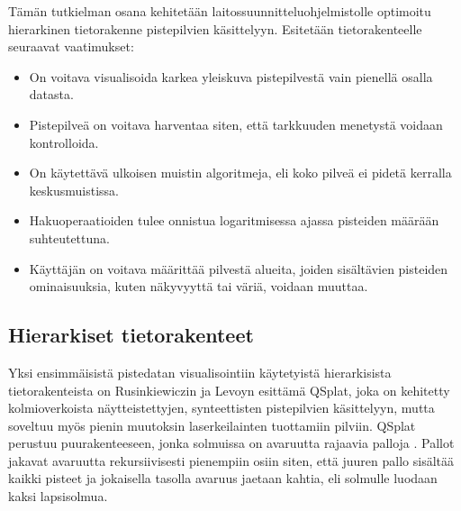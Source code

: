 Tämän tutkielman osana kehitetään laitossuunnitteluohjelmistolle optimoitu hierarkinen tietorakenne pistepilvien käsittelyyn. Esitetään tietorakenteelle seuraavat vaatimukset:
\begin{itemize}
    \item On voitava visualisoida karkea yleiskuva pistepilvestä vain pienellä osalla datasta. 
    \item Pistepilveä on voitava harventaa siten, että tarkkuuden menetystä voidaan kontrolloida.
    \item On käytettävä ulkoisen muistin algoritmeja, eli koko pilveä ei pidetä kerralla keskusmuistissa.
    \item Hakuoperaatioiden tulee onnistua logaritmisessa ajassa pisteiden määrään suhteutettuna.
    \item Käyttäjän on voitava määrittää pilvestä alueita, joiden sisältävien pisteiden ominaisuuksia, kuten näkyvyyttä tai väriä, voidaan muuttaa.
\end{itemize}

\subsection{Hierarkiset tietorakenteet}

Yksi ensimmäisistä pistedatan visualisointiin käytetyistä hierarkisista tietorakenteista on Rusinkiewiczin ja Levoyn esittämä QSplat, joka on kehitetty kolmioverkoista näytteistettyjen, synteettisten pistepilvien käsittelyyn, mutta soveltuu myös pienin muutoksin laserkeilainten tuottamiin pilviin. QSplat perustuu puurakenteeseen, jonka solmuissa on avaruutta rajaavia palloja . Pallot jakavat avaruutta rekursiivisesti pienempiin osiin siten, että juuren pallo sisältää kaikki pisteet ja jokaisella tasolla avaruus jaetaan kahtia, eli solmulle luodaan kaksi lapsisolmua. \cite{qsplat}